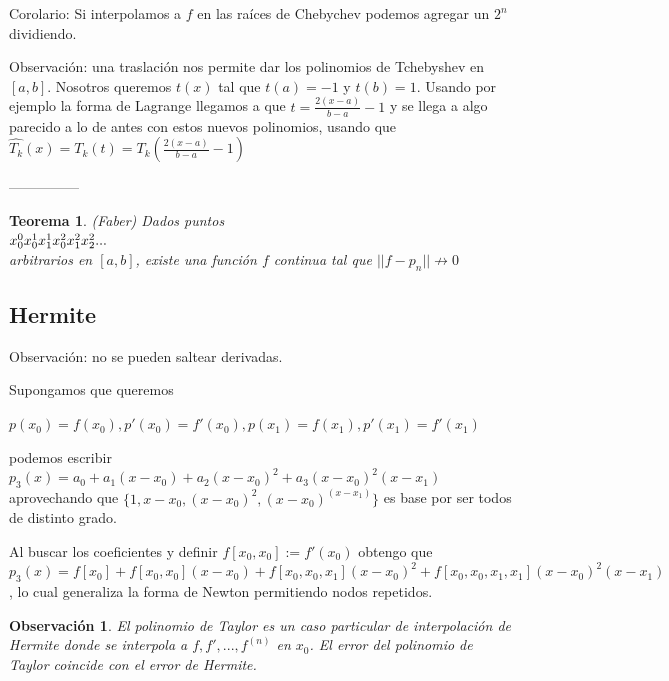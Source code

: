 \documentclass[10pt,a4paper,final]{report}
\newtheorem{theorem}{Teorema}
\newtheorem{observation}{Observación}
\begin{document}
{Corolario: Si interpolamos a $f$ en las raíces de Chebychev podemos agregar un $2^n$ dividiendo.


Observación: una traslación nos permite dar los polinomios de Tchebyshev en $[a,b]$. Nosotros queremos $t(x)$ tal que $t(a) = -1$ y $t(b) =1$. Usando por ejemplo la forma de Lagrange llegamos a que $t = \frac{2(x-a)}{b-a} - 1$ y se llega a algo parecido a lo de antes con estos nuevos polinomios, usando que $\hat{T_k}(x)= T_k(t) = T_k(\frac{2(x-a)}{b-a} - 1)$

---------------

\begin{theorem} (Faber) Dados puntos\\

$\\
x_0^0\\
x_0^1 x_1^1\\
x_0^2 x_1^2 x_2^2\\
...\\
$\\
arbitrarios en $[a,b]$, existe una función $f$ continua tal que $||f-p_n|| \not\to 0$
\end{theorem}

\subsection{Hermite}

Observación: no se pueden saltear derivadas.

Supongamos que queremos


$p(x_0)=f(x_0), p'(x_0) = f'(x_0), p(x_1) = f(x_1), p'(x_1) = f'(x_1)$

podemos escribir $p_3(x)= a_0 + a_1 (x-x_0) + a_2 (x-x_0)^2 + a_3 (x-x_0)^2 (x-x_1)$ aprovechando que $\{1,x-x_0,(x-x_0)^2, (x-x_0)^ (x-x_1)\}$ es base por ser todos de distinto grado.

Al buscar los coeficientes y definir $f[x_0,x_0] :=f'(x_0)$ obtengo que $p_3(x)= f[x_0] + f[x_0,x_0] (x-x_0) + f[x_0,x_0,x_1] (x-x_0)^2 + f[x_0,x_0,x_1,x_1] (x-x_0)^2 (x-x_1)$, lo cual generaliza la forma de Newton permitiendo nodos repetidos.


\begin{observation}
	El polinomio de Taylor es un caso particular de interpolación de Hermite donde se interpola a $f,f',...,f^{(n)}$ en $x_0$. El error del polinomio de Taylor coincide con el error de Hermite.
\end{observation}

}
\end{document}
